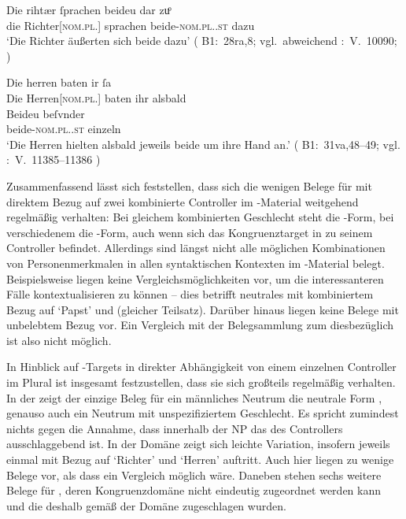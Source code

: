 \begin{exe}
\ex \label{ex:richtherriu2}
	\begin{xlist}
	\ex \label{ex:richtherriu2_1}
		\gll Die rihtær ſprachen beideu {dar zuͦ} \\
			die Richter[\textsc{nom.pl.\MascM}] sprachen beide-\textsc{nom.pl.\NeutM.st}
			dazu \\
		\trans `Die Richter äußerten sich beide dazu'
			(%
				B1:~28ra,8; vgl.~abweichend
				\KC:~V.~10090;
				\cite[267]{schroeder1895}%
			)

	\ex \label{ex:richtherriu2_2}
		\gll Die herren baten ir ſa \\
			Die Herren[\textsc{nom.pl.\MascM}] baten ihr alsbald \\
	\sn \gll Beideu beſvnder \\
			beide-\textsc{nom.pl.\NeutM.st} einzeln \\
		\trans `Die Herren hielten alsbald jeweils beide um ihre Hand an.'
			(%
				B1:~31va,48--49; vgl.
				\KC:~V.~11385--11386
				\cite[289]{schroeder1895}%
			)
	\end{xlist}
\end{exe}

Zusammenfassend lässt sich feststellen, dass sich die wenigen Belege für
 mit direktem Bezug auf zwei kombinierte Controller im
\KC{}-Material weitgehend regelmäßig verhalten: Bei gleichem
kombinierten Geschlecht steht die -Form, bei verschiedenem die
-Form, auch wenn sich das Kongruenztarget in  zu
seinem Controller befindet. Allerdings sind längst nicht alle möglichen
Kombinationen von Personenmerkmalen in allen syntaktischen Kontexten im
\KC{}-Material belegt. Beispielsweise liegen keine
Vergleichs\-möglich\-keiten vor, um die interessanteren Fälle kontextualisieren
zu können -- dies betrifft neutrales  mit kombiniertem Bezug auf
 `Papst' und  (gleicher Teilsatz). Darüber
hinaus liegen keine Belege mit unbelebtem Bezug vor. Ein
Vergleich mit der Belegsammlung zum \CAO{} diesbezüglich ist also nicht
möglich.

In Hinblick auf -Targets in direkter Abhängigkeit von einem
einzelnen Controller im Plural ist insgesamt festzustellen, dass sie sich
großteils regelmäßig verhalten. In der  
zeigt der einzige Beleg für ein männliches Neutrum die neutrale Form
, genauso auch ein Neutrum mit unspezifiziertem Geschlecht. Es
spricht zumindest nichts gegen die Annahme, dass innerhalb der
NP das  des Controllers ausschlaggebend ist. In
der Domäne  zeigt sich leichte Variation, insofern jeweils
einmal  mit Bezug auf  `Richter' und 
`Herren' auftritt. Auch hier liegen zu wenige Belege vor, als dass ein
Vergleich möglich wäre. Daneben stehen sechs weitere Belege für ,
deren Kongruenzdomäne nicht eindeutig zugeordnet werden kann und
die deshalb gemäß \citet[623]{ksw2} der Domäne 
zugeschlagen wurden.

